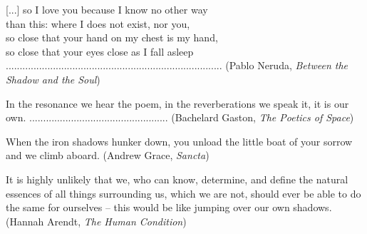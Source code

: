 \documentclass[11pt]{article}
\begin{document}
\begin{center}
[...] so I love you because I know no other way \\
than this: where I does not exist, nor you, \\
so close that your hand on my chest is my hand, \\
so close that your eyes close as I fall asleep \color{white}..............................................................................
\rightskip\leftskip
\phantom{text} \hfill \color{black}(Pablo Neruda, \textit{Between the Shadow and the Soul})
\end{center}

\begin{center}
In the resonance we hear the poem, in the reverberations we speak it, it is our own. \color{white}..................................................
\rightskip\leftskip
\phantom{text} \hfill \color{black}(Bachelard Gaston, \textit{The Poetics of Space})
\end{center}

\begin{center}
When the iron shadows hunker down, you unload the little boat of your sorrow and we climb aboard.
\rightskip\leftskip
\phantom{text} \hfill (Andrew Grace, \textit{Sancta})
\end{center}

\begin{center}
It is highly unlikely that we, who can know, determine, and define the natural essences of all things surrounding us, which we are not, should ever be able to do the same for ourselves -- this would be like jumping over our own shadows.
\rightskip\leftskip
\phantom{text} \hfill (Hannah Arendt, \textit{The Human Condition})
\end{center}
\endgroup
\end{document}
